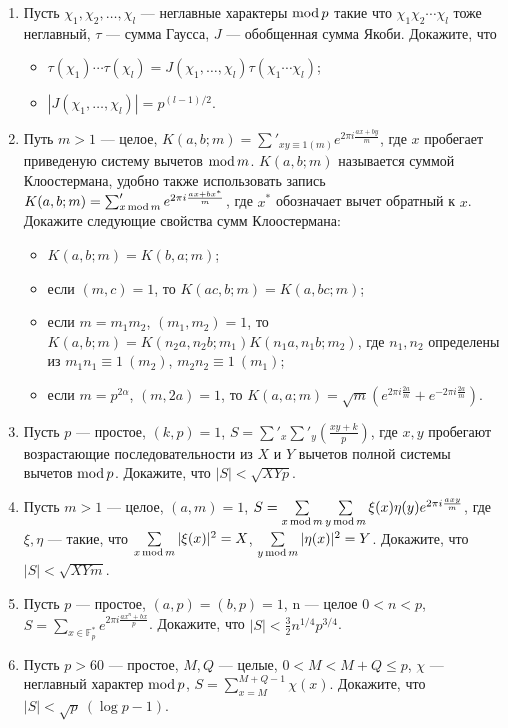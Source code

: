 \begin{enumerate}[topsep=0pt]
    \item Пусть $\chi_1, \chi_2, \dots, \chi_l$ --- неглавные характеры $\operatorname{mod} p$ такие что $\chi_1 \chi_2 \cdots \chi_l$ тоже неглавный, $\tau$ --- сумма Гаусса, $J$ --- обобщенная сумма Якоби. Докажите, что
    \begin{itemize}[noitemsep,topsep=0pt]
        \item $\tau(\chi_1) \cdots \tau(\chi_l) = J(\chi_1, \dots, \chi_l) \tau(\chi_1 \cdots \chi_l)$;
        \item $|J(\chi_1, \dots, \chi_l)| = p^{(l-1)/2}$.
    \end{itemize} %

    \item Путь $m>1$ --- целое, $K(a,b;m) = \sum'_{xy\equiv 1 (m)} e^{2\pi i \frac{ax+by}{m}}$, где $x$ пробегает приведеную систему вычетов $\operatorname{mod} m$. $K(a,b;m)$ называется суммой Клоостермана, удобно также использовать запись $K(a,b;m) = \sum'_{x \operatorname{mod} m} e^{2\pi i \frac{ax+bx^*}{m}}$, где $x^*$ обозначает вычет обратный к $x$. Докажите следующие свойства сумм Клоостермана:
    \begin{itemize}[noitemsep,topsep=0pt]
        \item $K(a,b;m)=K(b,a;m)$;
        \item если $(m,c)=1$, то $K(ac,b;m)=K(a,bc;m)$;
        \item если $m=m_1 m_2$, $(m_1,m_2)=1$, то $K(a,b;m)=K(n_2 a,n_2 b;m_1)K(n_1 a,n_1 b;m_2)$, где $n_1,n_2$ определены из $m_1 n_1 \equiv 1\ (m_2)$, $m_2 n_2 \equiv 1\ (m_1)$;
        \item если $m=p^{2\alpha}$, $(m,2a)=1$, то $K(a,a;m)=\sqrt{m}(e^{2\pi i \frac{2a}{m}}+e^{-2\pi i \frac{2a}{m}})$.
    \end{itemize} %

    \item Пусть $p$ --- простое, $(k,p)=1$, $S=\sum'_x \sum'_y \left(\frac{xy+k}{p}\right)$, где $x,y$ пробегают возрастающие последовательности из $X$ и $Y$ вычетов полной системы вычетов $\operatorname{mod} p$. Докажите, что $|S|<\sqrt{XYp}$. %

    \item Пусть $m>1$ --- целое, $(a,m)=1$, $S=\sum\limits_{x \operatorname{mod} m}\sum\limits_{y \operatorname{mod} m} \xi(x) \eta(y) e^{2\pi i \frac{axy}{m}}$, где $\xi,\eta$ --- такие, что $\sum\limits_{x \operatorname{mod} m} |\xi(x)|^2=X$, $\sum\limits_{y \operatorname{mod} m} |\eta(x)|^2=Y$. Докажите, что $|S|<\sqrt{XYm}$. %

    \item Пусть $p$ --- простое, $(a,p)=(b,p)=1$, n --- целое $0<n<p$, $S=\sum\limits_{x \in \mathbb{F}_p^*} e^{2\pi i \frac{ax^n+bx}{p}}$. Докажите, что $|S| < \frac{3}{2} n^{1/4} p^{3/4}$. %

    \item Пусть $p>60$ --- простое, $M,Q$ --- целые, $0<M<M+Q\leqslant p$, $\chi$ --- неглавный характер $\operatorname{mod} p$, $S = \sum\limits_{x=M}^{M+Q-1} \chi(x)$. Докажите, что $|S|<\sqrt{p}\ (\log p - 1)$. %
  
\end{enumerate}

